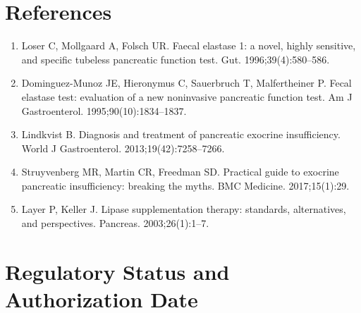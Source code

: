 \section*{References}
\begin{enumerate}
  \item Loser C, Mollgaard A, Folsch UR. Faecal elastase 1: a novel, highly sensitive, and specific tubeless pancreatic function test. Gut. 1996;39(4):580--586.
  \item Dominguez-Munoz JE, Hieronymus C, Sauerbruch T, Malfertheiner P. Fecal elastase test: evaluation of a new noninvasive pancreatic function test. Am J Gastroenterol. 1995;90(10):1834--1837.
  \item Lindkvist B. Diagnosis and treatment of pancreatic exocrine insufficiency. World J Gastroenterol. 2013;19(42):7258--7266.
  \item Struyvenberg MR, Martin CR, Freedman SD. Practical guide to exocrine pancreatic insufficiency: breaking the myths. BMC Medicine. 2017;15(1):29.
  \item Layer P, Keller J. Lipase supplementation therapy: standards, alternatives, and perspectives. Pancreas. 2003;26(1):1--7.
\end{enumerate}
\clearpage
\section*{Regulatory Status and Authorization Date}

\clearpage
